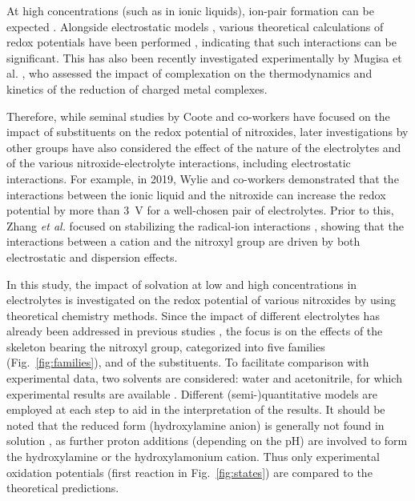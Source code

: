 \documentclass[review,preprint]{elsarticle}
\begin{document}
At high concentrations (such as in ionic liquids), ion-pair formation can be expected \cite{marcusIonPairing2006}. Alongside electrostatic models \cite{krishtalikElectrostaticIonSolvent1991,lundDielectricInterpretationSpecificity2010}, various theoretical calculations of redox potentials have been performed \cite{mehtaTheoreticalInvestigationRedox2007,quAccurateModelingEffect2016,taherkhaniInvestigationIonPairs2022}, indicating that such interactions can be significant. This has also been recently investigated experimentally by Mugisa et al. \cite{mugisaEffectIonparingKinetics2024}, who assessed the impact of complexation on the thermodynamics and kinetics of  the reduction  of charged metal complexes.

Therefore, while seminal studies by Coote and co-workers \cite{hodgsonOneElectronOxidationReduction2007,blincoExperimentalTheoreticalStudies2008} have focused on the impact of substituents on the redox potential of nitroxides, later investigations by other groups have also considered the effect of the nature of the electrolytes and of the various nitroxide-electrolyte interactions, including electrostatic interactions. For example, in 2019, Wylie and co-workers \cite{wylieImprovedPerformanceAllOrganic2019a,wylieIncreasedStabilityNitroxide2019b} demonstrated that the interactions between the ionic liquid and the nitroxide can increase the redox potential by more than \SI{3}{\volt} for a well-chosen pair of electrolytes. Prior to this, Zhang \textit{et al.} focused on stabilizing the radical-ion interactions \cite{zhangInteractionsImidazoliumBasedIonic2016,zhangEffectHeteroatomFunctionality2018}, showing that the interactions between a cation and the nitroxyl group are driven by both electrostatic and dispersion effects.

In this study, the impact of solvation at low and high concentrations in electrolytes is investigated on the redox potential of various nitroxides  by using theoretical chemistry methods. Since the impact of different electrolytes has already been addressed in previous studies \cite{wylieImprovedPerformanceAllOrganic2019a}, the focus is on the effects of the skeleton bearing the nitroxyl group, categorized into five families (Fig.~\ref{fig:families}), and of the substituents. To facilitate comparison with experimental data, two solvents are considered: water and acetonitrile, for which experimental results are available \cite{morrisChemicalElectrochemicalReduction1991,goldsteinStructureActivityRelationship2006,blincoExperimentalTheoreticalStudies2008,zhangEffectHeteroatomFunctionality2018}. 
Different (semi-)quantitative models are employed at each step to aid in the interpretation of the results. It should be noted that the reduced form (hydroxylamine anion) is generally not found in solution \cite{israeliKineticsMechanismComproportionation2005}, as further proton additions (depending on the pH) are involved to form the hydroxylamine or the hydroxylamonium cation. Thus only experimental oxidation potentials (first reaction in  Fig.~\ref{fig:states}) are compared to the theoretical predictions.
\end{document}
